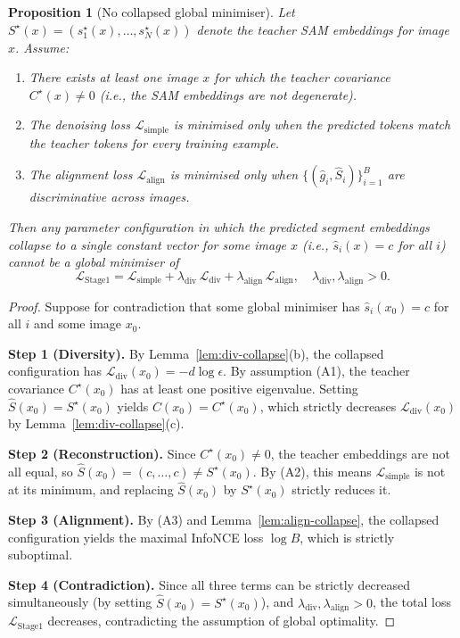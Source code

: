 \documentclass[12pt]{article}
\newtheorem{proposition}[theorem]{Proposition}
\begin{document}
\begin{proposition}[No collapsed global minimiser]
\label{prop:no-collapse}
Let $S^\star(x) = (s_1^\star(x), \ldots, s_N^\star(x))$ denote
the teacher SAM embeddings for image $x$.
Assume:
\begin{enumerate}
    \item[\textup{(A1)}] There exists at least one image $x$ for which the
    teacher covariance $C^\star(x) \neq 0$
    (i.e., the SAM embeddings are not degenerate).
    \item[\textup{(A2)}] The denoising loss $\mathcal{L}_{\mathrm{simple}}$
    is minimised only when the predicted tokens match the teacher tokens
    for every training example.
    \item[\textup{(A3)}] The alignment loss $\mathcal{L}_{\mathrm{align}}$
    is minimised only when $\{(\hat{g}_i, \hat{S}_i)\}_{i=1}^{B}$
    are discriminative across images.
\end{enumerate}
Then any parameter configuration in which the predicted segment
embeddings collapse to a single constant vector for some image $x$
(i.e., $\hat{s}_i(x) = c$ for all $i$) cannot be a global minimiser of
\begin{equation}
    \mathcal{L}_{\mathrm{Stage1}}
    = \mathcal{L}_{\mathrm{simple}}
    + \lambda_{\mathrm{div}}\, \mathcal{L}_{\mathrm{div}}
    + \lambda_{\mathrm{align}}\, \mathcal{L}_{\mathrm{align}},
    \quad \lambda_{\mathrm{div}}, \lambda_{\mathrm{align}} > 0.
\end{equation}
\end{proposition}

\begin{proof}
Suppose for contradiction that some global minimiser has
$\hat{s}_i(x_0) = c$ for all $i$ and some image $x_0$.

\textbf{Step 1 (Diversity).}
By Lemma~\ref{lem:div-collapse}(b), the collapsed configuration has
$\mathcal{L}_{\mathrm{div}}(x_0) = -d\log\epsilon$.
By assumption (A1), the teacher covariance $C^\star(x_0)$ has at least one
positive eigenvalue.
Setting $\hat{S}(x_0) = S^\star(x_0)$ yields
$C(x_0) = C^\star(x_0)$, which strictly decreases
$\mathcal{L}_{\mathrm{div}}(x_0)$ by Lemma~\ref{lem:div-collapse}(c).

\textbf{Step 2 (Reconstruction).}
Since $C^\star(x_0) \neq 0$, the teacher embeddings are not all equal,
so $\hat{S}(x_0) = (c, \ldots, c) \neq S^\star(x_0)$.
By (A2), this means $\mathcal{L}_{\mathrm{simple}}$ is not at its minimum,
and replacing $\hat{S}(x_0)$ by $S^\star(x_0)$ strictly reduces it.

\textbf{Step 3 (Alignment).}
By (A3) and Lemma~\ref{lem:align-collapse},
the collapsed configuration yields the maximal InfoNCE loss $\log B$,
which is strictly suboptimal.

\textbf{Step 4 (Contradiction).}
Since all three terms can be strictly decreased simultaneously
(by setting $\hat{S}(x_0) = S^\star(x_0)$), and $\lambda_{\mathrm{div}}, \lambda_{\mathrm{align}} > 0$,
the total loss $\mathcal{L}_{\mathrm{Stage1}}$ decreases,
contradicting the assumption of global optimality.
\end{proof}
\end{document}
